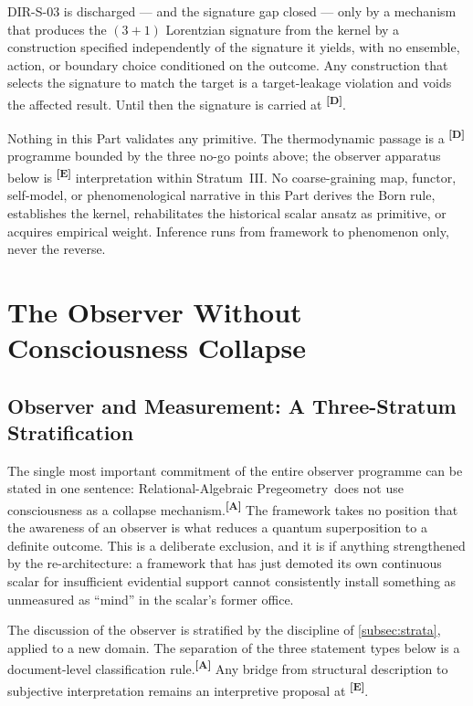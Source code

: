 \documentclass[12pt,a4paper,twoside]{article}
\theoremstyle{plain}
\theoremstyle{definition}
\theoremstyle{remark}
\newcommand{\ProjectShort}{Relational-Algebraic Pregeometry}
\newcommand{\RAP}{\ProjectShort}
\newcommand{\catmark}[1]{\textsuperscript{\textsf{\textbf{[#1]}}}}
\begin{document}
\begin{killswitch}
DIR-S-03 is discharged --- and the signature gap closed --- only by a
mechanism that produces the $(3{+}1)$ Lorentzian signature from the kernel
by a construction specified independently of the signature it yields, with
no ensemble, action, or boundary choice conditioned on the outcome. Any
construction that selects the signature to match the target is a
target-leakage violation and voids the affected result. Until then the
signature is carried at \catmark{D}.
\end{killswitch}

\begin{governancebox}
Nothing in this Part validates any primitive. The thermodynamic passage
is a \catmark{D} programme bounded by the three no-go points above; the
observer apparatus below is \catmark{E} interpretation within
Stratum~III. No coarse-graining map, functor, self-model, or
phenomenological narrative in this Part derives the Born rule,
establishes the kernel, rehabilitates the historical scalar ansatz as primitive, or acquires
empirical weight. Inference runs from framework to phenomenon only,
never the reverse.
\end{governancebox}

\section{The Observer Without Consciousness Collapse}
\label{sec:observer-no-collapse}

\subsection{Observer and Measurement: A Three-Stratum Stratification}
\label{subsec:observer-stratification}

The single most important commitment of the entire observer programme
can be stated in one sentence: \RAP\ does not use consciousness as a
collapse mech\-a\-nism.\catmark{A} The framework takes no position that the
awareness of an observer is what reduces a quantum superposition to a
definite outcome. This is a deliberate exclusion, and it is if anything
strengthened by the re-architecture: a framework that has just demoted
its own continuous scalar for insufficient evidential support cannot
consistently install something as unmeasured as ``mind'' in the scalar's
former office.

The discussion of the observer is stratified by the discipline of
\cref{subsec:strata}, applied to a new domain. The separation of the
three statement types below is a document-level classification rule.\catmark{A}
Any bridge from structural description to subjective interpretation remains
an interpretive proposal at \catmark{E}.
\end{document}
